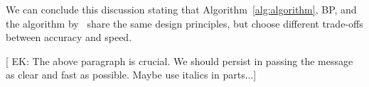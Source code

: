 We can conclude this discussion stating that Algorithm~\ref{alg:algorithm},
\textsf{BP}, and the algorithm by~\citet{GeisbergerSS08} share the same design
principles, but choose different trade-offs between accuracy and speed.  
\fi

[ EK: The above paragraph is crucial. We should persist in passing the message as clear and fast as possible.
Maybe use italics in parts...]

